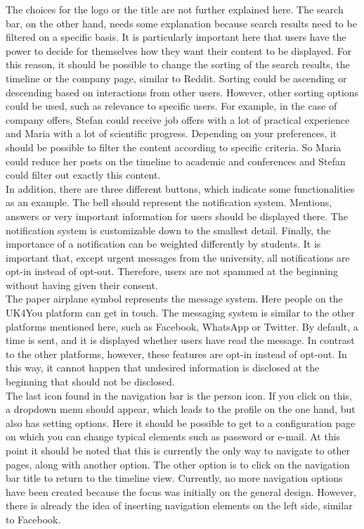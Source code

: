 The choices for the logo or the title are not further explained here.
The search bar, on the other hand, needs some explanation because search results need to be filtered on a specific basis.
It is particularly important here that users have the power to decide for themselves how they want their content to be displayed.
For this reason, it should be possible to change the sorting of the search results, the timeline or the company page, similar to Reddit.
Sorting could be ascending or descending based on interactions from other users.
However, other sorting options could be used, such as relevance to specific users.
For example, in the case of company offers, Stefan could receive job offers with a lot of practical experience and Maria with a lot of scientific progress.
Depending on your preferences, it should be possible to filter the content according to specific criteria.
So Maria could reduce her posts on the timeline to academic and conferences and Stefan could filter out exactly this content.\\

In addition, there are three different buttons, which indicate some functionalities as an example.
The bell should represent the notification system.
Mentions, answers or very important information for users should be displayed there.
The notification system is customizable down to the smallest detail.
Finally, the importance of a notification can be weighted differently by students.
It is important that, except urgent messages from the university, all notifications are opt-in instead of opt-out.
Therefore, users are not spammed at the beginning without having given their consent.\\

The paper airplane symbol represents the message system.
Here people on the UK4You platform can get in touch.
The messaging system is similar to the other platforms mentioned here, such as Facebook, WhatsApp or Twitter.
By default, a time is sent, and it is displayed whether users have read the message.
In contrast to the other platforms, however, these features are opt-in instead of opt-out.
In this way, it cannot happen that undesired information is disclosed at the beginning that should not be disclosed.\\

The last icon found in the navigation bar is the person icon.
If you click on this, a dropdown menu should appear, which leads to the profile on the one hand, but also has setting options.
Here it should be possible to get to a configuration page on which you can change typical elements such as password or e-mail.
At this point it should be noted that this is currently the only way to navigate to other pages, along with another option.
The other option is to click on the navigation bar title to return to the timeline view.
Currently, no more navigation options have been created because the focus was initially on the general design.
However, there is already the idea of inserting navigation elements on the left side, similar to Facebook.\\

